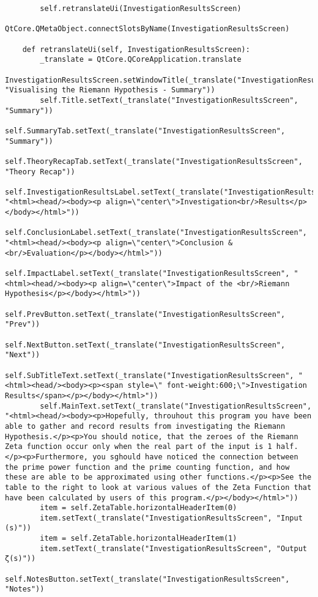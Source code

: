 \documentclass{article}
\begin{document}
\begin{lstlisting}
        self.retranslateUi(InvestigationResultsScreen)
        QtCore.QMetaObject.connectSlotsByName(InvestigationResultsScreen)

    def retranslateUi(self, InvestigationResultsScreen):
        _translate = QtCore.QCoreApplication.translate
        InvestigationResultsScreen.setWindowTitle(_translate("InvestigationResultsScreen", "Visualising the Riemann Hypothesis - Summary"))
        self.Title.setText(_translate("InvestigationResultsScreen", "Summary"))
        self.SummaryTab.setText(_translate("InvestigationResultsScreen", "Summary"))
        self.TheoryRecapTab.setText(_translate("InvestigationResultsScreen", "Theory Recap"))
        self.InvestigationResultsLabel.setText(_translate("InvestigationResultsScreen", "<html><head/><body><p align=\"center\">Investigation<br/>Results</p></body></html>"))
        self.ConclusionLabel.setText(_translate("InvestigationResultsScreen", "<html><head/><body><p align=\"center\">Conclusion & <br/>Evaluation</p></body></html>"))
        self.ImpactLabel.setText(_translate("InvestigationResultsScreen", "<html><head/><body><p align=\"center\">Impact of the <br/>Riemann Hypothesis</p></body></html>"))
        self.PrevButton.setText(_translate("InvestigationResultsScreen", "Prev"))
        self.NextButton.setText(_translate("InvestigationResultsScreen", "Next"))
        self.SubTitleText.setText(_translate("InvestigationResultsScreen", "<html><head/><body><p><span style=\" font-weight:600;\">Investigation Results</span></p></body></html>"))
        self.MainText.setText(_translate("InvestigationResultsScreen", "<html><head/><body><p>Hopefully, throuhout this program you have been able to gather and record results from investigating the Riemann Hypothesis.</p><p>You should notice, that the zeroes of the Riemann Zeta function occur only when the real part of the input is 1 half. </p><p>Furthermore, you sghould have noticed the connection between the prime power function and the prime counting function, and how these are able to be approximated using other functions.</p><p>See the table to the right to look at various values of the Zeta Function that have been calculated by users of this program.</p></body></html>"))
        item = self.ZetaTable.horizontalHeaderItem(0)
        item.setText(_translate("InvestigationResultsScreen", "Input (s)"))
        item = self.ZetaTable.horizontalHeaderItem(1)
        item.setText(_translate("InvestigationResultsScreen", "Output ζ(s)"))
        self.NotesButton.setText(_translate("InvestigationResultsScreen", "Notes"))
\end{lstlisting}
\end{document}
